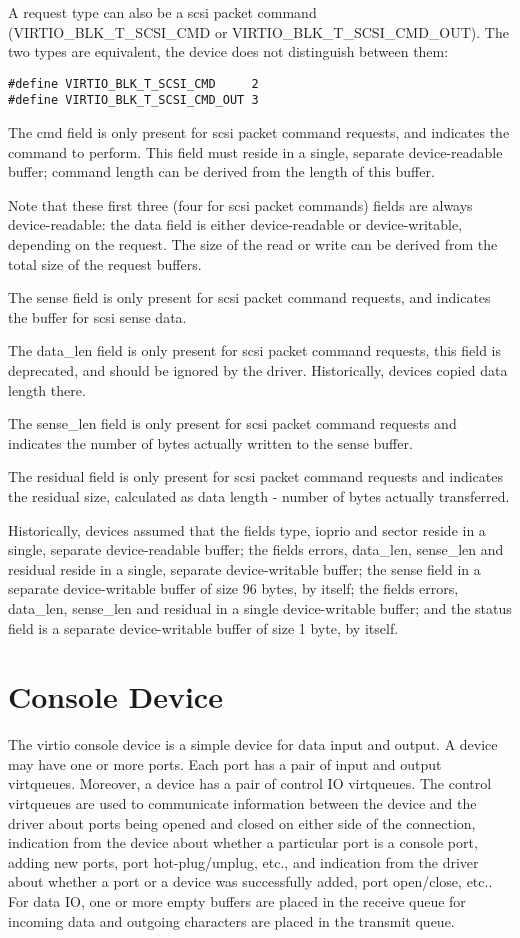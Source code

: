 A request type can also be a scsi packet command (VIRTIO_BLK_T_SCSI_CMD or
VIRTIO_BLK_T_SCSI_CMD_OUT).  The two types are equivalent, the device
does not distinguish between them:

\begin{lstlisting}
#define VIRTIO_BLK_T_SCSI_CMD     2
#define VIRTIO_BLK_T_SCSI_CMD_OUT 3
\end{lstlisting}

The cmd field is only present for scsi packet command requests,
and indicates the command to perform. This field must reside in a
single, separate device-readable buffer; command length can be derived
from the length of this buffer.

Note that these first three (four for scsi packet commands)
fields are always device-readable: the data field is either device-readable
or device-writable, depending on the request. The size of the read or
write can be derived from the total size of the request buffers.

The sense field is only present for scsi packet command requests,
and indicates the buffer for scsi sense data.

The data_len field is only present for scsi packet command
requests, this field is deprecated, and should be ignored by the
driver. Historically, devices copied data length there.

The sense_len field is only present for scsi packet command
requests and indicates the number of bytes actually written to
the sense buffer.

The residual field is only present for scsi packet command
requests and indicates the residual size, calculated as data
length - number of bytes actually transferred.

Historically, devices assumed that the fields type, ioprio and
sector reside in a single, separate device-readable buffer; the fields
errors, data_len, sense_len and residual reside in a single,
separate device-writable buffer; the sense field in a separate
device-writable buffer of size 96 bytes, by itself; the fields errors,
data_len, sense_len and residual in a single device-writable buffer;
and the status field is a separate device-writable buffer of size 1
byte, by itself.


\section{Console Device}\label{sec:Device Types / Console Device}

The virtio console device is a simple device for data input and
output. A device may have one or more ports. Each port has a pair
of input and output virtqueues. Moreover, a device has a pair of
control IO virtqueues. The control virtqueues are used to
communicate information between the device and the driver about
ports being opened and closed on either side of the connection,
indication from the device about whether a particular port is a
console port, adding new ports, port hot-plug/unplug, etc., and
indication from the driver about whether a port or a device was
successfully added, port open/close, etc.. For data IO, one or
more empty buffers are placed in the receive queue for incoming
data and outgoing characters are placed in the transmit queue.

